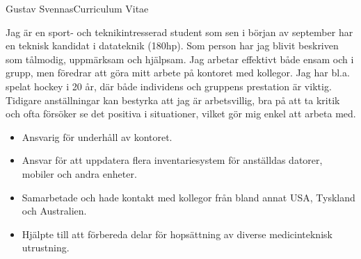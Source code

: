 \documentclass{article}
\begin{document}


\begin{cv}{Gustav Svennas}{Curriculum Vitae}


Jag är en sport- och teknikintresserad student som sen i början av september har en teknisk kandidat i datateknik (180hp). Som person har jag blivit beskriven som tålmodig, uppmärksam och hjälpsam. Jag arbetar effektivt både ensam och i grupp, men föredrar att göra mitt arbete på kontoret med kollegor. Jag har bl.a. spelat hockey i 20 år, där både individens och gruppens prestation är viktig. Tidigare anställningar kan bestyrka att jag är arbetsvillig, bra på att ta kritik och ofta försöker se det positiva i situationer, vilket gör mig enkel att arbeta med.



\begin{cvevent}[2022-07][2022-08]
    \begin{itemize}
        \item Ansvarig för underhåll av kontoret.
    \end{itemize}
\end{cvevent}


\begin{cvevent}[2021-03][2021-10]
    \begin{itemize}
        \item Ansvar för att uppdatera flera inventariesystem för anställdas datorer, mobiler och andra enheter.
        \item Samarbetade och hade kontakt med kollegor från bland annat USA, Tyskland och Australien.
    \end{itemize}
\end{cvevent}


\begin{cvevent}[2015-06][2015-07]
    \begin{itemize}
        \item Hjälpte till att förbereda delar för hopsättning av diverse medicinteknisk utrustning.
    \end{itemize}
\end{cvevent}


\end{cv}
\end{document}
